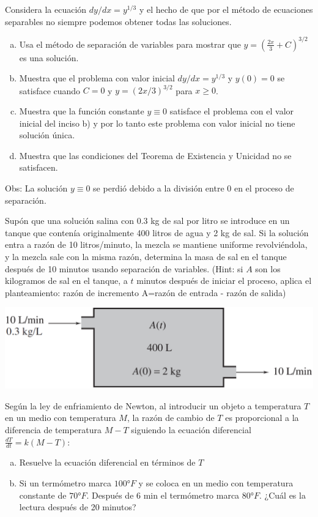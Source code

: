 \documentclass[12pt]{exam}
\begin{document}
\begin{questions}
     \question%
     Considera la ecuación $dy/dx=y^{1/3}$ y el hecho de que por el método de ecuaciones separables no siempre podemos obtener todas las soluciones.
     \begin{enumerate}[a)]
     	\item	Usa el método de separación de variables para mostrar que $y=\left(\frac{2x}{3}+C\right)^{3/2}$ es una solución.
        \item	Muestra que el problema con valor inicial $dy/dx=y^{1/3}$ y $y(0)=0$ se satisface cuando $C=0$ y $y=(2x/3)^{3/2}$ para $x\geq0$.
        \item	Muestra que la función constante $y\equiv0$ satisface el problema con el valor inicial del inciso b) y por lo tanto este problema con valor inicial no tiene solución única.
         \item	Muestra que las condiciones del Teorema de Existencia y Unicidad no se satisfacen.
     \end{enumerate}
Obs: La solución $y\equiv0$ se perdió debido a la división entre 0 en el proceso de separación.

     \question%
     Supón que una solución salina con 0.3 kg de sal por litro se introduce en un tanque que contenía originalmente 400 litros de agua y 2 kg de sal. Si la solución entra a razón de 10 litros/minuto, la mezcla se mantiene uniforme revolviéndola, y la mezcla sale con la misma razón, determina la masa de sal en el tanque después de 10 minutos usando separación de variables. (Hint: si $A$ son los kilogramos de sal en el tanque, a $t$ minutos después de iniciar el proceso, aplica el planteamiento: razón de incremento A=razón de entrada - razón de salida)
    
    \includegraphics[scale=.4]{F1T2.pdf}


     \question%
     Según la ley de enfriamiento de Newton, al introducir un objeto a temperatura $T$ en un medio con temperatura $M$, la razón de cambio de $T$ es proporcional a la diferencia de temperatura $M-T$ siguiendo la ecuación diferencial $\frac{dT}{dt}=k(M-T)$:
     \begin{enumerate}[a)]
     \item	Resuelve la ecuación diferencial en términos de $T$
     \item	Si un termómetro marca $100°F$ y se coloca en un medio con temperatura constante de $70°F$.  Después de 6 min el termómetro marca $80°F$. ¿Cuál es la lectura después de 20 minutos?
     \end{enumerate}



\end{questions}
\end{document}
